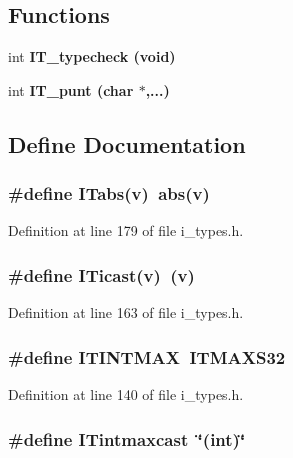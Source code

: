 \subsection*{Functions}
\begin{CompactItemize}
\item 
int \bf{IT\_\-typecheck} (void)
\item 
int \bf{IT\_\-punt} (char $\ast$,...)
\end{CompactItemize}


\subsection{Define Documentation}
\subsubsection{\setlength{\rightskip}{0pt plus 5cm}\#define ITabs(v)~abs(v)}\label{i__types_8h_74794af8be34608d5b85a33e8086db8c}




Definition at line 179 of file i\_\-types.h.
\subsubsection{\setlength{\rightskip}{0pt plus 5cm}\#define ITicast(v)~(v)}\label{i__types_8h_312731bb7bcd83287da3614e7b6b35b9}




Definition at line 163 of file i\_\-types.h.
\subsubsection{\setlength{\rightskip}{0pt plus 5cm}\#define ITINTMAX~ITMAXS32}\label{i__types_8h_249ffa49842e73358dd6900b16fd2d7a}




Definition at line 140 of file i\_\-types.h.
\subsubsection{\setlength{\rightskip}{0pt plus 5cm}\#define ITintmaxcast~\char`\"{}(int)\char`\"{}}\label{i__types_8h_d2aa36a199504c907cf9cdf71f31d690}




